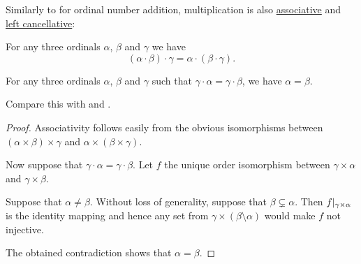 \begin{proposition}\label{thm:ordinal_multiplication_algebraic_properties}
  Similarly to  for ordinal number addition, multiplication is also \hyperref[def:magma/associative]{associative} and \hyperref[def:magma/cancellative]{left cancellative}:
  \begin{thmenum}
     For any three ordinals \( \alpha \), \( \beta \) and \( \gamma \) we have
    \begin{equation*}
      (\alpha \cdot \beta) \cdot \gamma = \alpha \cdot (\beta \cdot \gamma).
    \end{equation*}

     For any three ordinals \( \alpha \), \( \beta \) and \( \gamma \) such that \( \gamma \cdot \alpha = \gamma \cdot \beta \), we have \( \alpha = \beta \).
  \end{thmenum}

  Compare this with  and .
\end{proposition}
\begin{proof}
   Associativity follows easily from the obvious isomorphisms between \( (\alpha \times \beta) \times \gamma \) and \( \alpha \times (\beta \times \gamma) \).

   Now suppose that \( \gamma \cdot \alpha = \gamma \cdot \beta \). Let \( f \) the unique order isomorphism between \( \gamma \times \alpha \) and \( \gamma \times \beta \).

  Suppose that \( \alpha \neq \beta \). Without loss of generality, suppose that \( \beta \subsetneq \alpha \). Then \( f\vert_{\gamma \times \alpha} \) is the identity mapping and hence any set from \( \gamma \times (\beta \setminus \alpha) \) would make \( f \) not injective.

  The obtained contradiction shows that \( \alpha = \beta \).
\end{proof}

